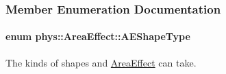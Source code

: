 \subsubsection{Member Enumeration Documentation}
\hypertarget{classphys_1_1AreaEffect_a99b8746c43eac266d48ad613110dc6f9}{
\paragraph[{AEShapeType}]{\setlength{\rightskip}{0pt plus 5cm}enum {\bf phys::AreaEffect::AEShapeType}}\hfill}
\label{classphys_1_1AreaEffect_a99b8746c43eac266d48ad613110dc6f9}


The kinds of shapes and \hyperlink{classphys_1_1AreaEffect}{AreaEffect} can take. 

